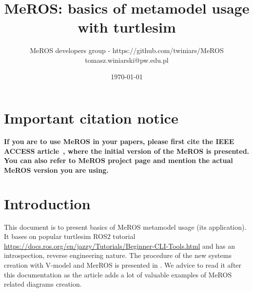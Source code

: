 \documentclass[11pt,oneside,a4paper]{report}
\begin{document}
	
\title{MeROS: basics of metamodel usage with turtlesim}
\author{MeROS developers group - https://github.com/twiniars/MeROS \\ tomasz.winiarski@pw.edu.pl}
\date{\today}
\maketitle

	
	
	\maketitle
	

	
\chapter*{Important citation notice}

\textbf{If you are to use MeROS in your papers, please first cite the IEEE ACCESS  article~\cite{meros-access}, where the initial version of the MeROS is presented. You can also refer to MeROS project page \cite{meros-www} and mention the actual MeROS version you are using.}
	
\chapter{Introduction}
\label{ch:introduction}

	This document is to present basics of MeROS metamodel usage (its application). It bases on popular turtlesim ROS2 tutorial \url{https://docs.ros.org/en/jazzy/Tutorials/Beginner-CLI-Tools.html} and has an introspection, reverse engineering nature. The procedure of the new systems creation with V-model and MerROS is presented in \cite{winiarski2025-v-model}. We advice to read it after this documentation as the article adds a lot of valuable examples of MeROS related diagrams creation. 
\end{document}
